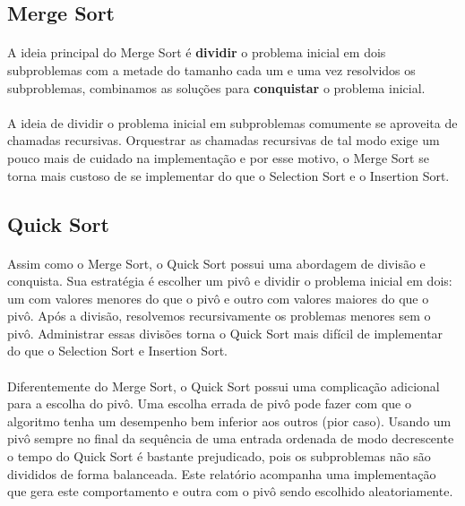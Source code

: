 \documentclass[11pt,a4paper]{article}
\begin{document}
        \subsection{Merge Sort}

        \paragraph{}
        A ideia principal do Merge Sort é \textbf{dividir} o problema inicial em dois subproblemas com a metade do tamanho cada um e uma vez resolvidos os subproblemas, combinamos as soluções para \textbf{conquistar} o problema inicial. 
        \paragraph{}
        A ideia de dividir o problema inicial em subproblemas comumente se aproveita de chamadas recursivas. Orquestrar as chamadas recursivas de tal modo exige um pouco mais de cuidado na implementação e por esse motivo, o Merge Sort se torna mais custoso de se implementar do que o Selection Sort e o Insertion Sort.
        

        \subsection{Quick Sort}
        \paragraph{}
        Assim como o Merge Sort, o Quick Sort possui uma abordagem de divisão e conquista. Sua estratégia é escolher um pivô e dividir o problema inicial em dois: um com valores menores do que o pivô e outro com valores maiores do que o pivô. Após a divisão, resolvemos recursivamente os problemas menores sem o pivô. Administrar essas divisões torna o Quick Sort mais difícil de implementar do que o Selection Sort e Insertion Sort. 

        \paragraph{}
        Diferentemente do Merge Sort, o Quick Sort possui uma complicação adicional para a escolha do pivô. Uma escolha errada de pivô pode fazer com que o algoritmo tenha um desempenho bem inferior aos outros (pior caso). Usando um pivô sempre no final da sequência de uma entrada ordenada de modo decrescente o tempo do Quick Sort é bastante prejudicado, pois os subproblemas não são divididos de forma balanceada. Este relatório acompanha uma implementação que gera este comportamento e outra com o pivô sendo escolhido aleatoriamente.
\end{document}
